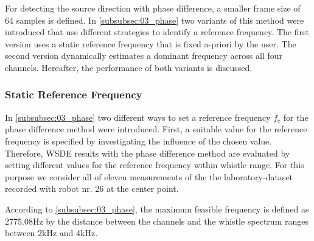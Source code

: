 For detecting the source direction with phase difference, a smaller frame
size of 64 samples is defined.
In \cref{subsubsec:03_phase} two variants of this method were introduced that use
different strategies to identify a reference frequency. The first version uses
a static reference frequency that is fixed a-priori by the user. The second version
dynamically estimates a dominant frequency across all four channels. Hereafter,
the performance of both variants is discussed.


\subsubsection*{Static Reference Frequency}

In \cref{subsubsec:03_phase} two different ways to set a reference frequency $f_c$
for the phase difference method were introduced.
First, a suitable value for the reference frequency is specified by
investigating the influence of the chosen value.
Therefore, \ac{WSDE} results with the phase difference method are evaluated by setting
different values for the reference frequency within whistle range.
For this purpose we consider all of eleven measurements of the the laboratory-dataset
recorded with robot nr. 26 at the center point.

According to \cref{subsubsec:03_phase}, the maximum feasible frequency is defined as
2775.08\si{\hertz} by the distance between the channels
and the whistle spectrum ranges between 2\si{\kilo\hertz}
and 4\si{\kilo\hertz}.

